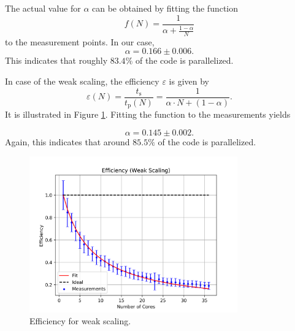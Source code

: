 \documentclass[12pt, a4paper, titlepage]{article}
\begin{document}
{The actual value for $\alpha$ can be obtained by fitting the function
\begin{equation}
f(N)=\frac{1}{\alpha + \frac{1-\alpha}{N}}
\end{equation}
to the measurement points. In our case,
\begin{equation} 
\alpha = 0.166 \pm 0.006.
\end{equation}
This indicates that roughly $83.4\%$ of the code is parallelized.

\newpage
In case of the weak scaling, the efficiency $\varepsilon$ is given by
\begin{equation*}
	\varepsilon (N) = \frac{t_\text{s}}{t_\text{p}(N)} = 	\frac{1}{\alpha\cdot N + (1-\alpha)}.
\end{equation*} 
It is illustrated in Figure \ref{fig:efficiency}. Fitting the function to the measurements yields


%


\begin{equation}
\alpha = 0.145 \pm 0.002.
\end{equation}
Again, this indicates that around $85.5\%$ of the code is parallelized.

\begin{figure}[h!]
\begin{center}
\includegraphics[width=0.8\textwidth]{pictures/speedup_weak.png}
\end{center}
\caption{Efficiency for weak scaling.}
\label{fig:efficiency}
\end{figure}


}
\end{document}
